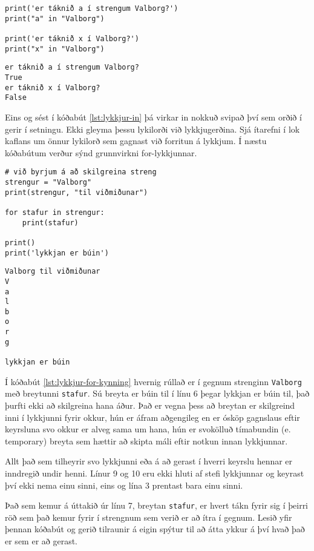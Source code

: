 \begin{lstlisting}[caption=Lykilorðið in, label=lst:lykkjur-in]
print('er táknið a í strengum Valborg?')
print("a" in "Valborg")

print('er táknið x í Valborg?')
print("x" in "Valborg")
\end{lstlisting}
\lstset{style=uttak}
\begin{lstlisting}
er táknið a í strengum Valborg?
True
er táknið x í Valborg?
False
\end{lstlisting}
\lstset{style=venjulegt}

Eins og sést í kóðabút \ref{lst:lykkjur-in} þá virkar in nokkuð svipað því sem orðið í gerir í setningu.
Ekki gleyma þessu lykilorði við lykkjugerðina.
Sjá ítarefni í lok kaflans um önnur lykilorð sem gagnast við forritun á lykkjum.
Í næstu kóðabútum verður sýnd grunnvirkni for-lykkjunnar.

\begin{lstlisting}[caption=For lykkjur kynntar, label=lst:lykkjur-for-kynning]
# við byrjum á að skilgreina streng
strengur = "Valborg"
print(strengur, "til viðmiðunar")

for stafur in strengur:
	print(stafur)
	
print()
print('lykkjan er búin')
\end{lstlisting}
\lstset{style=uttak}
\begin{lstlisting}
Valborg til viðmiðunar
V
a
l
b
o
r
g

lykkjan er búin
\end{lstlisting}

Í kóðabút \ref{lst:lykkjur-for-kynning} hvernig rúllað er í gegnum strenginn \texttt{Valborg} með breytunni \texttt{stafur}.
Sú breyta er búin til í línu 6 þegar lykkjan er búin til, það þurfti ekki að skilgreina hana áður.
Það er vegna þess að breytan er skilgreind inni í lykkjunni fyrir okkur, hún er áfram aðgengileg en er ósköp gagnslaus eftir keyrsluna svo okkur er alveg sama um hana, hún er svokölluð tímabundin (e. temporary) breyta sem hættir að skipta máli eftir notkun innan lykkjunnar.

Allt það sem tilheyrir svo lykkjunni eða á að gerast í hverri keyrslu hennar er inndregið undir henni.
Línur 9 og 10 eru ekki hluti af stefi lykkjunnar og keyrast því ekki nema einu sinni, eins og lína 3 prentast bara einu sinni.

Það sem kemur á úttakið úr línu 7, breytan \texttt{stafur}, er hvert tákn fyrir sig í þeirri röð sem það kemur fyrir í strengnum sem verið er að ítra í gegnum.
Lesið yfir þennan kóðabút og gerið tilraunir á eigin spýtur til að átta ykkur á því hvað það er sem er að gerast.

